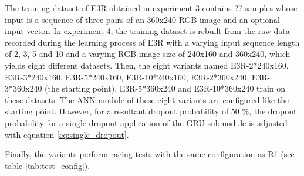 The training dataset of E3R obtained in experiment 3
contains ?? samples 
whose input is a sequence of 
three pairs of an 360x240 RGB image 
and an optional input vector.
In experiment 4, 
the training dataset is rebuilt from the raw data
recorded during the learning process of E3R
with a varying input sequence length of 
2, 3, 5 and 10
and a varying RGB image size of 
240x160 and 360x240,
which yields eight different datasets.
Then, 
the eight variants
named 
E3R-2*240x160,
E3R-3*240x160,
E3R-5*240x160,
E3R-10*240x160,
E3R-2*360x240,
E3R-3*360x240 (the starting point),
E3R-5*360x240
and
E3R-10*360x240
train on these datasets.
The ANN module of these eight variants
are configured like the starting point.
However, for a resultant dropout probability
of 50 \%, the dropout probability
for a single dropout application of the GRU submodule
is adjusted with equation \ref{eq:single_dropout}.

Finally,
the variants perform
racing tests with the same
configuration as R1 (see table \ref{tab:test_config}).









